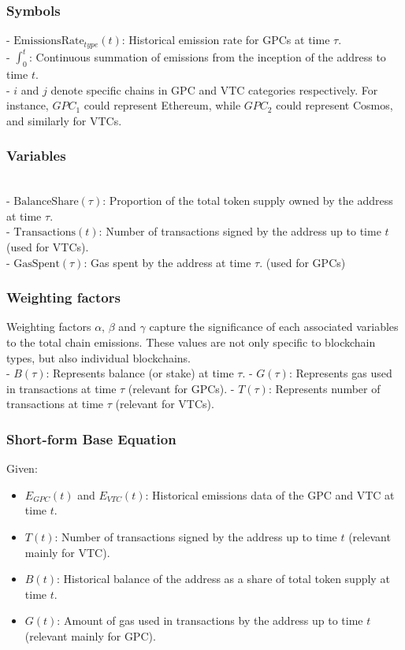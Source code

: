 \documentclass{article}
\begin{document}
\subsubsection*{Symbols}
- \(\text{EmissionsRate}_{type}(t)\): Historical emission rate for GPCs at time \(\tau\). \\
- \( \int_{0}^{t} \): Continuous summation of emissions from the inception of the address to time \(t\). \\
- \( i \) and \( j \) denote specific chains in GPC and VTC categories respectively. For instance, \( GPC_1 \) could represent Ethereum, while \( GPC_2 \) could represent Cosmos, and similarly for VTCs.

\subsubsection*{Variables} \\
- \(\text{BalanceShare}(\tau)\): Proportion of the total token supply owned by the address at time \(\tau\). \\
- \(\text{Transactions}(t)\): Number of transactions signed by the address up to time $t$ (used for VTCs). \\
- \(\text{GasSpent}(\tau)\): Gas spent by the address at time \(\tau\). (used for GPCs)
\subsubsection*{Weighting factors} 
Weighting factors $\alpha$, $\beta$ and $\gamma$ capture the significance of each associated variables to the total chain emissions. These values are not only specific to blockchain types, but also individual blockchains. \\ 


- \( B(\tau) \): Represents balance (or stake) at time \( \tau \).
- \( G(\tau) \): Represents gas used in transactions at time \( \tau \) (relevant for GPCs).
- \( T(\tau) \): Represents number of transactions at time \( \tau \) (relevant for VTCs).

\subsubsection{Short-form Base Equation}
Given:
\begin{itemize}
    \item $E_{GPC}(t)$ and $E_{VTC}(t)$: Historical emissions data of the GPC and VTC at time $t$.
    \item $T(t)$: Number of transactions signed by the address up to time $t$ (relevant mainly for VTC).
    \item $B(t)$: Historical balance of the address as a share of total token supply at time $t$.
    \item $G(t)$: Amount of gas used in transactions by the address up to time $t$ (relevant mainly for GPC).
\end{itemize}
\end{document}
